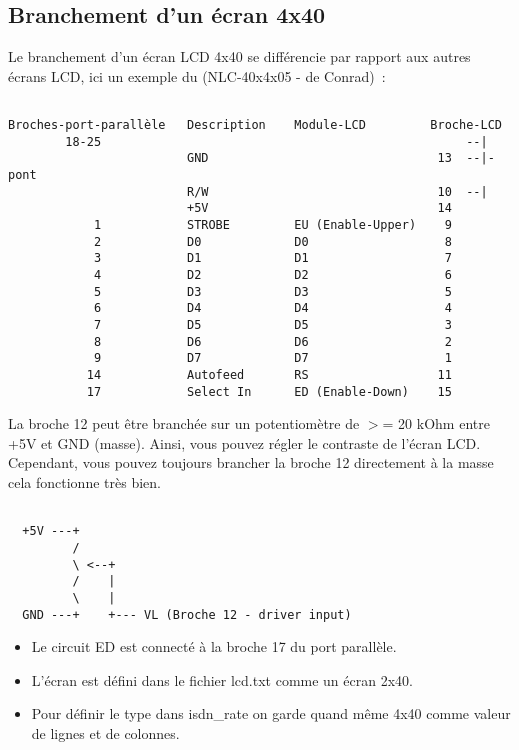 \subsection{Branchement d'un écran 4x40}

  Le branchement d'un écran LCD 4x40 se différencie par rapport aux autres
  écrans LCD, ici un exemple du (NLC-40x4x05 - de Conrad)~:

\begin{example}
\begin{verbatim}

Broches-port-parallèle   Description    Module-LCD         Broche-LCD
        18-25                                                   --|
                         GND                                13  --|- pont
                         R/W                                10  --|
                         +5V                                14
            1            STROBE         EU (Enable-Upper)    9
            2            D0             D0                   8
            3            D1             D1                   7
            4            D2             D2                   6
            5            D3             D3                   5
            6            D4             D4                   4
            7            D5             D5                   3
            8            D6             D6                   2
            9            D7             D7                   1
           14            Autofeed       RS                  11
           17            Select In      ED (Enable-Down)    15
\end{verbatim}
\end{example}

  La broche 12 peut être branchée sur un potentiomètre de $>$= 20 kOhm entre
  +5V et GND (masse). Ainsi, vous pouvez régler le contraste de l'écran LCD.
  Cependant, vous pouvez toujours brancher la broche 12 directement à la masse
  cela fonctionne très bien.

\begin{example}
\begin{verbatim}

  +5V ---+
         /
         \ <--+
         /    |
         \    |
  GND ---+    +--- VL (Broche 12 - driver input)
\end{verbatim}
\end{example}


  \begin{itemize}
  \item Le circuit ED est connecté à la broche 17 du port parallèle.

  \item L'écran est défini dans le fichier lcd.txt comme un écran 2x40.

  \item Pour définir le type dans isdn\_rate on garde quand même 4x40 comme
        valeur de lignes et de colonnes.
  \end{itemize}


